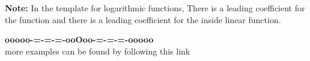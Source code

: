 \documentclass{ximera}
\begin{document}
\textbf{Note:}  In the template for logarithmic functions, There is a leading coefficient for the function and there is a leading coefficient for the inside linear function. \\





\begin{center}
\textbf{\textcolor{green!50!black}{ooooo-=-=-=-ooOoo-=-=-=-ooooo}} \\

more examples can be found by following this link\\ 

\end{center}
\end{document}
